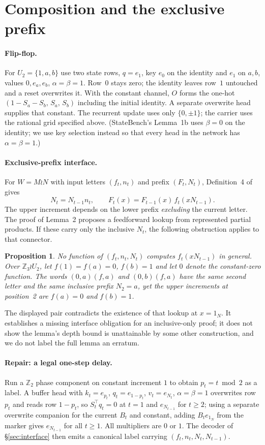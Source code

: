 \documentclass[10pt]{article}
\newtheorem{proposition}{Proposition}
\theoremstyle{remark}
\newcommand{\Z}{\mathbb Z}
\begin{document}
\section{Composition and the exclusive prefix}\label{sec:wreath}

\paragraph{Flip-flop.} For $U_2=\{1,a,b\}$ use two state rows, $q=e_1$, key $e_0$ on the identity and $e_1$ on $a,b$, values $0,e_a,e_b$, $\alpha=\beta=1$. Row~$0$ stays zero; the identity leaves row~$1$ untouched and a reset overwrites it. With the constant channel, $O$ forms the one-hot $(1-S_a-S_b,\,S_a,\,S_b)$ including the initial identity. A separate overwrite head supplies that
constant. The recurrent update uses only $\{0,\pm1\}$; the carrier uses the rational
grid specified above. (StateBench's Lemma~1b uses $\beta=0$ on the identity; we use key selection instead so that every head in the network has $\alpha=\beta=1$.)

\paragraph{Exclusive-prefix interface.} For $W=M\wr N$ with input letters $(f_t,n_t)$ and prefix $(F_t,N_t)$, Definition~4 of~\citet{statebench} gives
\[
N_t=N_{t-1}n_t,\qquad F_t(x)=F_{t-1}(x)\,f_t(xN_{t-1}).
\]
The upper increment depends on the lower prefix \emph{excluding} the current letter. The proof of Lemma~2 proposes a feedforward lookup from represented partial
products. If these carry only the inclusive $N_t$, the following obstruction
applies to that connector.

\begin{proposition}
No function of $(f_t,n_t,N_t)$ computes $f_t(xN_{t-1})$ in general. Over $\Z_3\wr U_2$, let $f(1)=f(a)=0$, $f(b)=1$ and let $0$ denote the constant-zero function. The words $(0,a)(f,a)$ and $(0,b)(f,a)$ have the same second letter and the same inclusive prefix $N_2=a$, yet the upper increments at position~2 are $f(a)=0$ and $f(b)=1$.
\end{proposition}

The displayed pair contradicts the existence of that lookup at $x=1_N$.
It establishes a missing interface obligation for an inclusive-only proof; it does not show the lemma's depth bound is unattainable by some other construction, and we do not label the full lemma an erratum.

\paragraph{Repair: a legal one-step delay.} Run a $\Z_2$ phase component on constant increment $1$ to obtain $p_t=t\bmod 2$ as a label. A buffer head with $k_t=e_{p_t}$, $q_t=e_{1-p_t}$, $v_t=e_{N_t}$, $\alpha=\beta=1$ overwrites row $p_t$ and reads row $1-p_t$, so $S_t^\top q_t=0$ at $t=1$ and $e_{N_{t-1}}$ for $t\ge2$; using a separate overwrite companion for the current $B_t$ and constant,
adding $B_te_{1_N}$ from the marker gives $e_{N_{t-1}}$ for all $t\ge1$. All multipliers are $0$ or $1$. The decoder of \S\ref{sec:interface} then emits a canonical label carrying $(f_t,n_t,N_t,N_{t-1})$.
\end{document}
